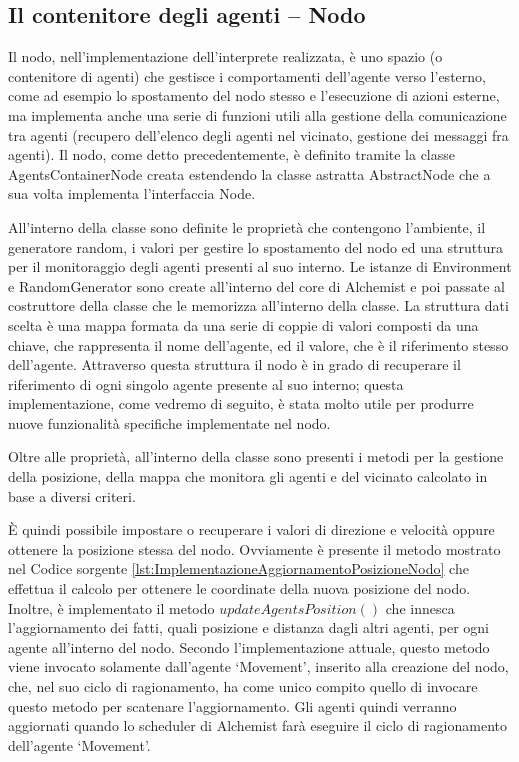 \subsection{Il contenitore degli agenti -- Nodo}\label{sctn:AgentsContainerNode}
Il nodo, nell'implementazione dell'interprete realizzata, è uno spazio (o contenitore di agenti) che gestisce i comportamenti dell'agente verso l'esterno, come ad esempio lo spostamento del nodo stesso e l'esecuzione di azioni esterne, ma implementa anche una serie di funzioni utili alla gestione della comunicazione tra agenti (recupero dell'elenco degli agenti nel vicinato, gestione dei messaggi fra agenti). Il nodo, come detto precedentemente, è definito tramite la classe AgentsContainerNode creata estendendo la classe astratta AbstractNode che a sua volta implementa l'interfaccia Node.

All'interno della classe sono definite le proprietà che contengono l'ambiente, il generatore random, i valori per gestire lo spostamento del nodo ed una struttura per il monitoraggio degli agenti presenti al suo interno.
Le istanze di Environment e RandomGenerator sono create all'interno del core di Alchemist e poi passate al costruttore della classe che le memorizza all'interno della classe. %
La struttura dati scelta è una mappa formata da una serie di coppie di valori composti da una chiave, che rappresenta il nome dell'agente, ed il valore, che è il riferimento stesso dell'agente. Attraverso questa struttura il nodo è in grado di recuperare il riferimento di ogni singolo agente presente al suo interno; questa implementazione, come vedremo di seguito, è stata molto utile per produrre nuove funzionalità specifiche implementate nel nodo.

Oltre alle proprietà, all'interno della classe sono presenti i metodi per la gestione della posizione, della mappa che monitora gli agenti e del vicinato calcolato in base a diversi criteri.

\`E quindi possibile impostare o recuperare i valori di direzione e velocità oppure ottenere la posizione stessa del nodo. Ovviamente è presente il metodo mostrato nel Codice sorgente \ref{lst:ImplementazioneAggiornamentoPosizioneNodo} che effettua il calcolo per ottenere le coordinate della nuova posizione del nodo.
Inoltre, è implementato il metodo $updateAgentsPosition()$ che innesca l'aggiornamento dei fatti, quali posizione e distanza dagli altri agenti, per ogni agente all'interno del nodo. Secondo l'implementazione attuale, questo metodo viene invocato solamente dall'agente `Movement', inserito alla creazione del nodo, che, nel suo ciclo di ragionamento, ha come unico compito quello di invocare questo metodo per scatenare l'aggiornamento. Gli agenti quindi verranno aggiornati quando lo scheduler di Alchemist farà eseguire il ciclo di ragionamento dell'agente `Movement'.


